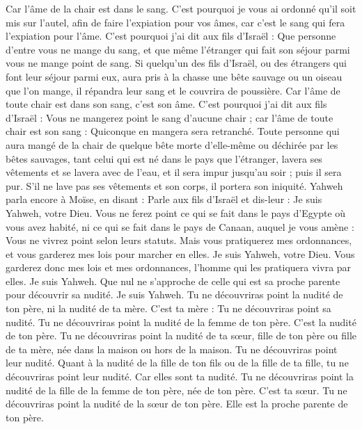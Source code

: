 \begin{multicols}{2}
Car l'âme de la chair est dans le sang. C'est pourquoi je vous ai ordonné qu'il soit mis sur l'autel, afin de faire l’expiation pour vos âmes, car c'est le sang qui fera l’expiation pour l'âme.
C'est pourquoi j'ai dit aux fils d'Israël : Que personne d'entre vous ne mange du sang, et que même l'étranger qui fait son séjour parmi vous ne mange point de sang.
Si quelqu’un des fils d'Israël, ou des étrangers qui font leur séjour parmi eux, aura pris à la chasse une bête sauvage ou un oiseau que l'on mange, il répandra leur sang et le couvrira de poussière.
Car l'âme de toute chair est dans son sang, c'est son âme. C'est pourquoi j'ai dit aux fils d'Israël : Vous ne mangerez point le sang d'aucune chair ; car l'âme de toute chair est son sang : Quiconque en mangera sera retranché.
Toute personne qui aura mangé de la chair de quelque bête morte d'elle-même ou déchirée par les bêtes sauvages, tant celui qui est né dans le pays que l'étranger, lavera ses vêtements et se lavera avec de l'eau, et il sera impur jusqu'au soir ; puis il sera pur.
S'il ne lave pas ses vêtements et son corps, il portera son iniquité.
\VerseOne{}Yahweh parla encore à Moïse, en disant :
Parle aux fils d'Israël et dis-leur : Je suis Yahweh, votre Dieu.
Vous ne ferez point ce qui se fait dans le pays d'Egypte où vous avez habité, ni ce qui se fait dans le pays de Canaan, auquel je vous amène : Vous ne vivrez point selon leurs statuts.
Mais vous pratiquerez mes ordonnances, et vous garderez mes lois pour marcher en elles. Je suis Yahweh, votre Dieu.
Vous garderez donc mes lois et mes ordonnances, l'homme qui les pratiquera vivra par elles. Je suis Yahweh.
Que nul ne s'approche de celle qui est sa proche parente pour découvrir sa nudité. Je suis Yahweh.
Tu ne découvriras point la nudité de ton père, ni la nudité de ta mère. C'est ta mère : Tu ne découvriras point sa nudité.
Tu ne découvriras point la nudité de la femme de ton père. C’est la nudité de ton père.
Tu ne découvriras point la nudité de ta sœur, fille de ton père ou fille de ta mère, née dans la maison ou hors de la maison. Tu ne découvriras point leur nudité.
Quant à la nudité de la fille de ton fils ou de la fille de ta fille, tu ne découvriras point leur nudité. Car elles sont ta nudité.
Tu ne découvriras point la nudité de la fille de la femme de ton père, née de ton père. C'est ta sœur.
Tu ne découvriras point la nudité de la sœur de ton père. Elle est la proche parente de ton père.

\end{multicols}
